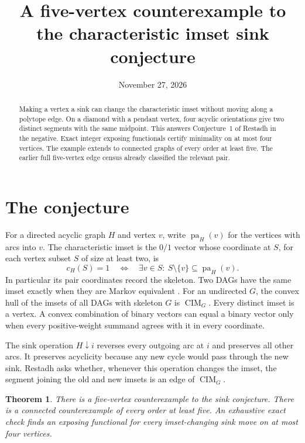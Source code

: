 \documentclass[11pt]{amsart}
\title{A five-vertex counterexample to the characteristic imset sink conjecture}
\date{November 27, 2026}
\newtheorem{theorem}{Theorem}
\newcommand{\CIM}{\operatorname{CIM}}
\begin{document}
\begin{abstract}
Making a vertex a sink can change the characteristic imset without
moving along a polytope edge. On a diamond with a pendant vertex,
four acyclic orientations give two distinct segments with the same
midpoint. This answers Conjecture~1 of Restadh in the negative.
Exact integer exposing functionals certify minimality on at most
four vertices. The example extends to connected graphs of every
order at least five. The earlier full five-vertex edge census
already classified the relevant pair.
\end{abstract}
\maketitle

\section{The conjecture}
For a directed acyclic graph \(H\) and vertex \(v\), write
\(\operatorname{pa}_H(v)\) for the vertices with arcs into \(v\).
The characteristic imset is the \(0/1\) vector whose coordinate
at \(S\), for each vertex subset \(S\) of size at least two, is
\[
 c_H(S)=1\quad\Longleftrightarrow\quad
 \exists v\in S:\ S\setminus\{v\}\subseteq\operatorname{pa}_H(v).
\]
In particular its pair coordinates record the skeleton. Two DAGs
have the same imset exactly when they are Markov equivalent
\cite[Theorem~1.4]{diam}. For an undirected \(G\), the convex hull
of the imsets of all DAGs with skeleton \(G\) is \(\CIM_G\).
Every distinct imset is a vertex. A convex combination of binary
vectors can equal a binary vector only when every positive-weight
summand agrees with it in every coordinate.

The sink operation \(H\downarrow i\) reverses every outgoing arc
at \(i\) and preserves all other arcs. It preserves acyclicity
because any new cycle would pass through the new sink. Restadh
\cite[Conjecture~1, p.~11]{diam} asks whether, whenever this operation
changes the imset, the segment joining the old and new imsets is
an edge of \(\CIM_G\).

\begin{theorem}
There is a five-vertex counterexample to the sink conjecture.
There is a connected counterexample of every order at least five.
An exhaustive exact check finds an exposing functional for every
imset-changing sink move on at most four vertices.
\end{theorem}
\end{document}
